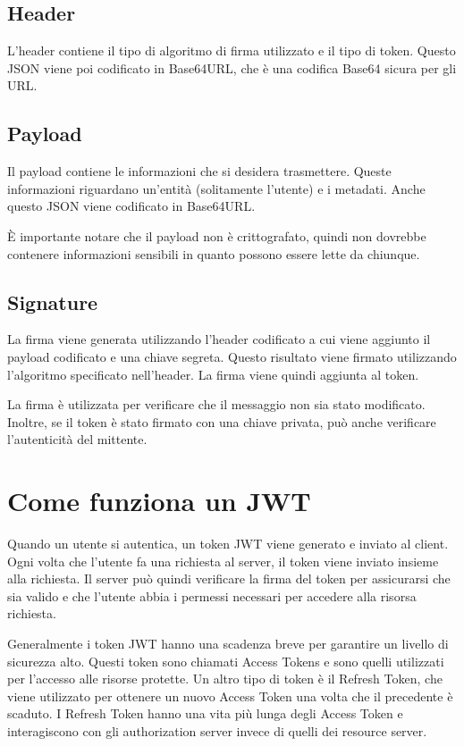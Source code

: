 \documentclass{article}
\begin{document}
\subsection{Header}
L'header contiene il tipo di algoritmo di firma utilizzato e il tipo di token.
Questo JSON viene poi codificato in Base64URL, che è una codifica Base64 sicura per gli URL.

\subsection{Payload}

Il payload contiene le informazioni che si desidera trasmettere.
Queste informazioni riguardano un'entità (solitamente l'utente) e i metadati.
Anche questo JSON viene codificato in Base64URL.

È importante notare che il payload non è crittografato, quindi non dovrebbe contenere informazioni sensibili in quanto possono essere lette da chiunque.

\subsection{Signature}
La firma viene generata utilizzando l'header codificato a cui viene aggiunto il payload codificato e una chiave segreta.
Questo risultato viene firmato utilizzando l'algoritmo specificato nell'header.
La firma viene quindi aggiunta al token.

La firma è utilizzata per verificare che il messaggio non sia stato modificato.
Inoltre, se il token è stato firmato con una chiave privata, può anche verificare l'autenticità del mittente.

\section{Come funziona un JWT}
Quando un utente si autentica, un token JWT viene generato e inviato al client.
Ogni volta che l'utente fa una richiesta al server, il token viene inviato insieme alla richiesta.
Il server può quindi verificare la firma del token per assicurarsi che sia valido e che l'utente abbia i permessi necessari per accedere alla risorsa richiesta.

Generalmente i token JWT hanno una scadenza breve per garantire un livello di sicurezza alto.
Questi token sono chiamati Access Tokens e sono quelli utilizzati per l'accesso alle risorse protette.
Un altro tipo di token è il Refresh Token, che viene utilizzato per ottenere un nuovo Access Token una volta che il precedente è scaduto.
I Refresh Token hanno una vita più lunga degli Access Token e interagiscono con gli authorization server invece di quelli dei resource server.
\end{document}
